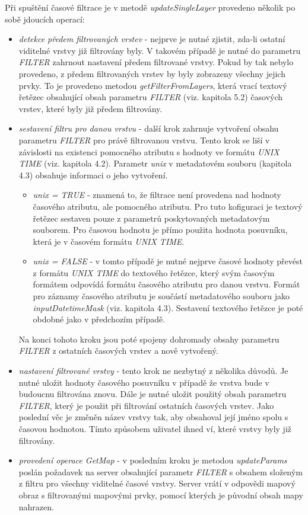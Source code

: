 Při spuštění časové filtrace je v metodě \textit{updateSingleLayer} provedeno několik po sobě jdoucích operací:
\begin{itemize}
	\item\textit{detekce předem filtrovaných vrstev} - nejprve je nutné zjistit, zda-li ostatní viditelné vrstvy již filtrovány byly. V takovém případě je nutné do parametru \textit{FILTER} zahrnout nastavení předem filtrované vrstvy. Pokud by tak nebylo provedeno, z předem filtrovaných vrstev by byly zobrazeny všechny jejich prvky. To je provedeno metodou \textit{getFilterFromLayers}, která vrací textový řetězec obsahující obsah parametru \textit{FILTER}  (viz. kapitola 5.2) časových vrstev, které byly již předem filtrovány.
	\item\textit{sestavení filtru pro danou vrstvu} - další krok zahrnuje vytvoření obsahu parametru \textit{FILTER} pro právě filtrovanou vrstvu. Tento krok se liší v závislosti na existenci pomocného atributu s hodnoty ve formátu \textit{UNIX TIME} (viz. kapitola 4.2). Parametr \textit{unix} v metadatovém souboru (kapitola 4.3) obsahuje informaci o jeho vytvoření.
	\begin{itemize}
		\item\textit{unix = TRUE} - znamená to, že filtrace není provedena nad hodnoty časového atributu, ale pomocného atributu. Pro tuto kofiguraci je textový řetězec sestaven pouze z parametrů poskytovaných metadatovým souborem. Pro časovou hodnotu je přímo použita hodnota posuvníku, která je v časovém formátu \textit{UNIX TIME}.
		\item\textit{unix = FALSE} - v tomto případě je nutné nejprve časové hodnoty převést z formátu \textit{UNIX TIME} do textového řetězce, který svým časovým formátem odpovídá formátu časového atributu pro danou vrstvu. Formát pro záznamy časového atributu je součástí metadatového souboru jako \textit{inputDatetimeMask} (viz. kapitola 4.3). Sestavení textového řetězce je poté obdobné jako v předchozím případě.
	\end{itemize}
	Na konci tohoto kroku jsou poté spojeny dohromady obsahy parametru \textit{FILTER} z ostatních časových vrstev a nově vytvořený.
	\item\textit{nastavení filtrované vrstvy} - tento krok ne nezbytný z několika důvodů. Je nutné uložit hodnoty časového posuvníku v případě že vrstva bude v budoucnu filtrována znovu. Dále je nutné uložit použitý obsah parametru \textit{FILTER}, který je použit při filtrování ostatních časových vrstev. Jako poslední věc je změněn název vrstvy tak, aby obsahoval její jméno spolu s časovou hodnotou. Tímto způsobem uživatel ihned ví, které vrstvy byly již filtrovány.
	\item\textit{provedení operace GetMap} - v posledním kroku je metodou \textit{updateParams} poslán požadavek na server obsahující parametr \textit{FILTER} s obsahem složeným z filtru pro všechny viditelné časové vrstvy. Server vrátí v odpovědi mapový obraz s filtrovanými mapovými prvky, pomocí kterých je původní obsah mapy nahrazen.
\end{itemize}

